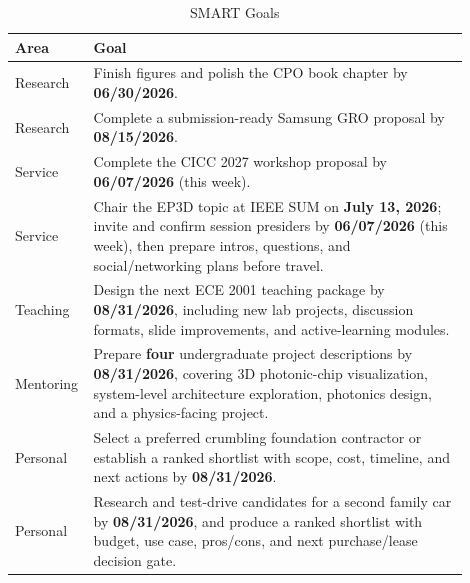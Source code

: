 \documentclass[custom, sidenote, final]{cls/oneproposal}
\begin{document}
\begin{table}[htbp]
    \centering
    \footnotesize
    \caption{SMART Goals}\label{tab:goals}
    \begin{tabular}{m{0.1\linewidth} p{0.8\linewidth}}
        \toprule
        \textbf{Area} & \textbf{Goal}                                                                                                                                                                                                                 \\
        \midrule
        Research      & Finish figures and polish the CPO book chapter by \textbf{06/30/2026}.                                                                                                                                                        \\
        \midrule
        Research      & Complete a submission-ready Samsung GRO proposal by \textbf{08/15/2026}.                                                                                                                                                      \\
        \midrule
        Service       & Complete the CICC 2027 workshop proposal by \textbf{06/07/2026} (this week).                                                                                                                                                  \\
        \midrule
        Service       & Chair the EP3D topic at IEEE SUM on \textbf{July 13\textendash 15, 2026}; invite and confirm session presiders by \textbf{06/07/2026} (this week), then prepare intros, questions, and social/networking plans before travel. \\
        \midrule
        Teaching      & Design the next ECE 2001 teaching package by \textbf{08/31/2026}, including new lab projects, discussion formats, slide improvements, and active-learning modules.                                                            \\
        \midrule
        Mentoring     & Prepare \textbf{four} undergraduate project descriptions by \textbf{08/31/2026}, covering 3D photonic-chip visualization, system-level architecture exploration, photonics design, and a physics-facing project.              \\
        \midrule
        Personal      & Select a preferred crumbling foundation contractor or establish a ranked shortlist with scope, cost, timeline, and next actions by \textbf{08/31/2026}.                                                                       \\
        \midrule
        Personal      & Research and test-drive candidates for a second family car by \textbf{08/31/2026}, and produce a ranked shortlist with budget, use case, pros/cons, and next purchase/lease decision gate.                                    \\
        \bottomrule
    \end{tabular}
\end{table}
\end{document}
